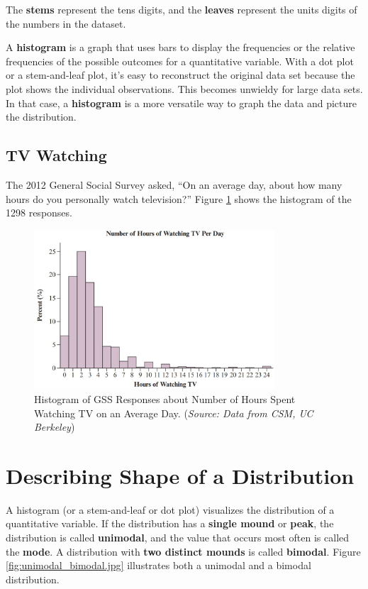 \noindent The \textbf{stems} represent the tens digits, and the \textbf{leaves} represent the units digits of the numbers in the dataset.


A \textbf{histogram} is a graph that uses bars to display the frequencies or the relative frequencies of the possible outcomes for a quantitative variable. With a dot plot or a stem-and-leaf plot, it’s easy to reconstruct the original data set because the plot shows the individual observations. This becomes unwieldy for large data sets. In that case, a \textbf{histogram} is a more versatile way to graph the data and picture the distribution. 


\subsection*{TV Watching}
The 2012 General Social Survey asked, “On an average day, about how many
hours do you personally watch television?” Figure \ref{fig:histogram.jpg} shows the histogram of the 1298 responses. 

\begin{figure}[h!]
\centering
\includegraphics[width=0.8\textwidth]{figures/histogram.jpg}
\caption{Histogram of GSS Responses about Number of Hours Spent
Watching TV on an Average Day. (\textit{Source: Data from CSM, UC Berkeley})}
\label{fig:histogram.jpg}
\end{figure}

\section{Describing Shape of a Distribution}
A histogram (or a stem-and-leaf or dot plot) visualizes the distribution of a quantitative variable. If the distribution has a \textbf{single mound} or \textbf{peak}, the distribution is called \textbf{unimodal}, and the value that occurs most often is called the \textbf{mode}. A distribution with \textbf{two distinct mounds} is called \textbf{bimodal}. Figure \ref{fig:unimodal_bimodal.jpg} illustrates both a unimodal and a bimodal distribution.

